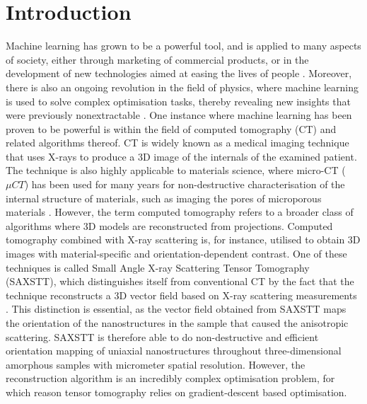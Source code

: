 \chapter{Introduction}


Machine learning has grown to be a powerful tool, and is applied to many aspects of society,
either through marketing of commercial products, or in the development of new technologies aimed at easing the lives of people \cite{Goodfellow-et-al-2016}.
Moreover, there is also an ongoing revolution in the field of physics,
where machine learning is used to solve complex optimisation tasks, thereby revealing new insights that were previously nonextractable \cite{carleo2019machine}.
One instance where machine learning has been proven to be powerful is within the field of computed tomography (CT) and related algorithms thereof.
CT is widely known as a medical imaging technique that uses X-rays to produce a 3D image of the internals of the examined patient.
The technique is also highly applicable to materials science, where micro-CT ($\mu CT$) has been used for many years for non-destructive characterisation of the internal structure of materials, such as imaging the pores of microporous materials \cite{orhan2020micro}.
However, the term computed tomography refers to a broader class of algorithms where 3D models are reconstructed from projections.
Computed tomography combined with X-ray scattering is, for instance, utilised to obtain 3D images with material-specific and orientation-dependent contrast.
One of these techniques is called Small Angle X-ray Scattering Tensor Tomography (SAXSTT), which distinguishes itself from conventional CT by the fact that the technique
reconstructs a 3D vector field based on X-ray scattering measurements \cite{liebi2015nanostructure}.
This distinction is essential, as the vector field obtained from SAXSTT maps the orientation of the nanostructures in the sample that caused the anisotropic scattering.
SAXSTT is therefore able to do non-destructive and efficient orientation mapping of uniaxial nanostructures throughout three-dimensional amorphous samples with micrometer spatial resolution.
However, the reconstruction algorithm is an incredibly complex optimisation problem, for which reason tensor tomography relies on gradient-descent based optimisation.


